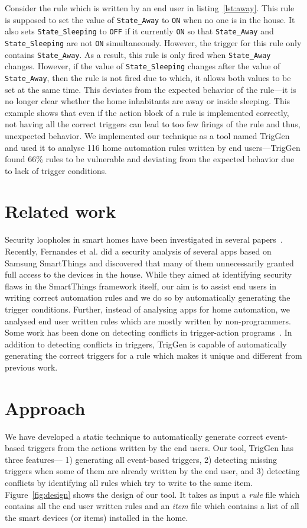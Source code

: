 \documentclass{sig-alternate-05-2015}
\begin{document}
Consider the rule which is written by an end user in listing~\ref{lst:away}. This rule is supposed to set the value of \texttt{State\_Away} to \texttt{ON} when no one is in the house. It also sets \texttt{State\_Sleeping} to \texttt{OFF} if it currently \texttt{ON} so that  \texttt{State\_Away} and \texttt{State\_Sleeping} are not \texttt{ON} simultaneously. However, the trigger for this rule only contains \texttt{State\_Away}. As a result, this rule is only fired when \texttt{State\_Away} changes. However, if the value of \texttt{State\_Sleeping} changes after the value of \texttt{State\_Away}, then the rule is not fired due to which, it allows both values to be set at the same time. This deviates from the expected behavior of the rule---it is no longer clear whether the home inhabitants are away or inside sleeping. This example shows that even if the action block of a rule is implemented correctly, not having all the correct triggers can lead to too few firings of the rule and thus, unexpected behavior. 
We implemented our technique as a tool named TrigGen and used it to analyse 116 home automation rules written by end users---TrigGen found 66\% rules to be vulnerable and deviating from the expected behavior due to lack of trigger conditions.

\section{Related work}
Security loopholes in smart homes have been investigated in several papers~\cite{yoshi, dhanjani, jung, todayToTomorrow}. Recently, Fernandes et al.\cite{smartthings16} did a  security analysis of several apps based on Samsung SmartThings and discovered that many of them unnecessarily granted full access to the devices in the house. While they aimed at identifying security flaws in the SmartThings framework itself, our aim is to assist end users in writing correct automation rules and we do so by automatically generating the trigger conditions.  Further, instead of analysing apps for home automation, we analysed end user written rules which are mostly written by non-programmers. Some work has been done on detecting conflicts in trigger-action programs~\cite{rvs, homer, utea}. In addition to detecting conflicts in triggers, TrigGen is capable of automatically generating the correct triggers for a rule which makes it unique and different from previous work.

\section{Approach}
We have developed a static technique to automatically generate correct event-based triggers from the actions written by the end users. Our tool, TrigGen has three features--- 1) generating all event-based triggers, 2) detecting missing triggers when some of them are already written by the end user, and 3) detecting conflicts by identifying all rules which try to write to the same item. 
Figure~\ref{fig:design} shows the design of our tool. It takes as input a \textit{rule} file which contains all the end user written rules and an \textit{item} file which contains a list of all the smart devices (or items) installed in the home. 
\end{document}
